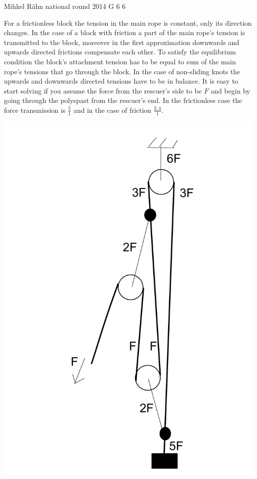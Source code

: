 \documentclass[11pt]{article}
\begin{document}
{Mihkel Rähn} %
{national round} %
{2014} %
{G 6} %
{6} %
{

\ifEngSolution
For a frictionless block the tension in the main rope is constant, only its direction changes. In the case of a block with friction a part of the main rope’s tension is transmitted to the block, moreover in the first approximation downwards and upwards directed frictions compensate each other. To satisfy the equilibrium condition the block’s attachment tension has to be equal to sum of the main rope’s tensions that go through the block. In the case of non-sliding knots the upwards and downwards directed tensions have to be in balance. It is easy to start solving if you assume the force from the rescuer’s side to be $F$ and begin by going through the polyspast from the rescuer’s end. In the frictionless case the force transmission is $\frac{5}{1}$ and in the case of friction $\frac{2,4}{1}$. 
\begin{center}
\includegraphics[scale=0.25]{2014-v3g-06-PolyspastL1}

\end{center}}
\end{document}
